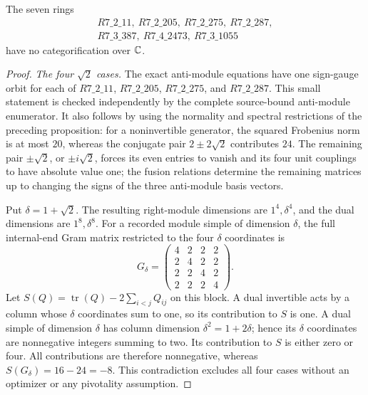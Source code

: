 \begin{theorem}
\label{thm:dual-gram}
The seven rings
\[
 \begin{gathered}
 R7\_2\_11,\ R7\_2\_205,\ R7\_2\_275,\ R7\_2\_287,\\
 R7\_3\_387,\ R7\_4\_2473,\ R7\_3\_1055
 \end{gathered}
\]
have no categorification over $\mathbb C$.
\end{theorem}
\begin{proof}
\emph{The four $\sqrt2$ cases.}
The exact anti-module equations have one sign-gauge orbit for each of
$R7\_2\_11$, $R7\_2\_205$, $R7\_2\_275$, and $R7\_2\_287$.
This small statement is checked independently by the complete
source-bound anti-module enumerator. It also follows by using the
normality and spectral restrictions of the preceding proposition:
for a noninvertible generator, the squared Frobenius norm is at most
$20$, whereas the conjugate pair $2\pm2\sqrt2$ contributes $24$.
The remaining pair $\pm\sqrt2$, or $\pm i\sqrt2$, forces its even
entries to vanish and its four unit couplings to have absolute value
one; the fusion relations determine the remaining matrices up to
changing the signs of the three anti-module basis vectors.

Put $\delta=1+\sqrt2$. The resulting right-module dimensions are
$1^4,\delta^4$, and the dual dimensions are $1^8,\delta^8$.
For a recorded module simple of dimension $\delta$, the full
internal-end Gram matrix restricted to the four $\delta$ coordinates is
\[
 G_\delta=\begin{pmatrix}
 4&2&2&2\\2&4&2&2\\2&2&4&2\\2&2&2&4
 \end{pmatrix}.
\]
Let $S(Q)=\operatorname{tr}(Q)-2\sum_{i<j}Q_{ij}$ on this block.
A dual invertible acts by a column whose $\delta$ coordinates sum to
one, so its contribution to $S$ is one. A dual simple of dimension
$\delta$ has column dimension $\delta^2=1+2\delta$; hence its
$\delta$ coordinates are nonnegative integers summing to two.
Its contribution to $S$ is either zero or four. All contributions
are therefore nonnegative, whereas $S(G_\delta)=16-24=-8$.
This contradiction excludes all four cases without an optimizer or
any pivotality assumption.



\end{proof}

